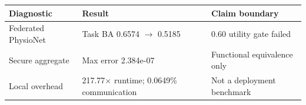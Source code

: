 \begin{tabular}{lll}
\toprule
Diagnostic & Result & Claim boundary \\
\midrule
Federated PhysioNet & Task BA 0.6574 $\rightarrow$ 0.5185 & 0.60 utility gate failed \\
Secure aggregate & Max error 2.384e-07 & Functional equivalence only \\
Local overhead & 217.77$\times$ runtime; 0.0649\% communication & Not a deployment benchmark \\
\bottomrule
\end{tabular}

